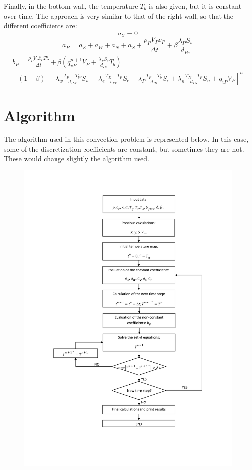 Finally, in the bottom wall, the temperature $T_{b}$ is also given, but it is constant over time. The approach is very similar to that of the right wall, so that the different coefficients are:
\begin{equation}
a_{S}=0
\end{equation}
\begin{equation}
a_P=a_{E}+a_{W}+a_{N}+a_{S}+\frac{\rho_{P}V_{P}\bar{c}_{P}}{\Delta t}+\beta\frac{\lambda_{P}S_{s}}{d_{Ps}}
\end{equation}
\begin{multline}
b_{P}=\frac{\rho_{P}V_{P}\bar{c}_{P}T_{P}^{n}}{\Delta t}+\beta\left(\dot{q}_{vP}^{n+1}V_{P}+\frac{\lambda_{P}S_{s}}{d_{Ps}}T_{b}\right) \\
+\left(1-\beta\right)\left[-\lambda_{w}\frac{T_{P}-T_{W}}{d_{PW}}S_{w}+\lambda_{e}\frac{T_{E}-T_{P}}{d_{PE}}S_{e}-\lambda_{P}\frac{T_{P}-T_{b}}{d_{Ps}}S_{s}+\lambda_{n}\frac{T_{N}-T_{P}}{d_{PN}}S_{n}+\dot{q}_{vP}V_{P}\right]^{n}
\end{multline}

\section{Algorithm}
The algorithm used in this convection problem is represented below. In this case, some of the discretization coefficients are constant, but sometimes they are not. These would change slightly the algorithm used.
\begin{figure}[h]
	\centering
	\includegraphics[scale=0.21]{FourMaterials/algorithm}
\end{figure}

